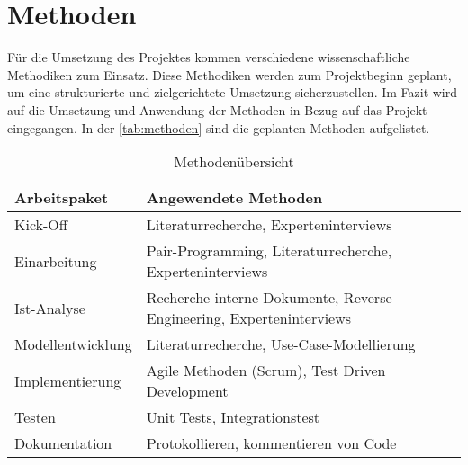 \chapter{Methoden}
Für die Umsetzung des Projektes kommen verschiedene wissenschaftliche Methodiken zum Einsatz. Diese Methodiken werden
zum Projektbeginn geplant, um eine strukturierte und zielgerichtete Umsetzung sicherzustellen. Im Fazit wird auf die 
Umsetzung und Anwendung der Methoden in Bezug auf das Projekt eingegangen. In der \autoref{tab:methoden} sind die 
geplanten Methoden aufgelistet.

\begin{table}[H]                                
    \centering
    \caption{Methodenübersicht}
    \begin{tabular}{|l|l|} \hline
        \textbf{Arbeitspaket}   & \textbf{Angewendete Methoden}                                         \\ \hline
        Kick-Off                & Literaturrecherche, Experteninterviews                                \\ \hline
        Einarbeitung            & Pair-Programming, Literaturrecherche, Experteninterviews              \\ \hline  
        Ist-Analyse             & Recherche interne Dokumente, Reverse Engineering, Experteninterviews  \\ \hline
        Modellentwicklung       & Literaturrecherche, Use-Case-Modellierung                             \\ \hline 
        Implementierung         & Agile Methoden (Scrum), Test Driven Development                       \\ \hline
        Testen                  & Unit Tests, Integrationstest                                          \\ \hline
        Dokumentation           & Protokollieren, kommentieren von Code                                 \\ \hline
    \end{tabular}
    \label{tab:methoden}
\end{table}

